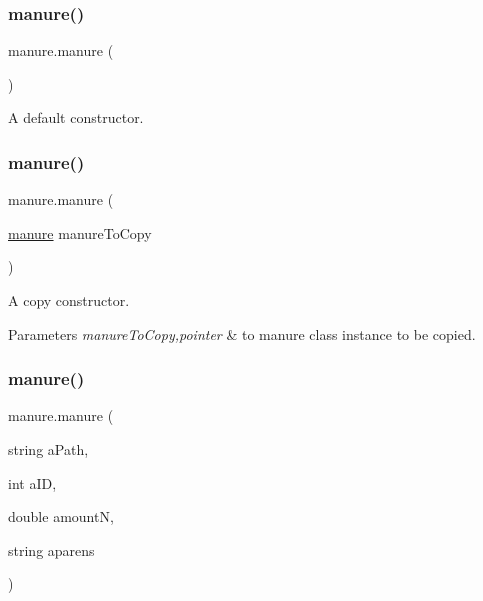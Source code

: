 \subsubsection{\texorpdfstring{manure()}{manure()}\hspace{0.1cm}{\footnotesize\ttfamily [1/3]}}
{\footnotesize\ttfamily manure.\+manure (\begin{DoxyParamCaption}{ }\end{DoxyParamCaption})\hspace{0.3cm}{\ttfamily [inline]}}



A default constructor. 

\mbox{\label{classmanure_a38ddb577591d36f8bd5e4c7d8fed6d51}} 
\subsubsection{\texorpdfstring{manure()}{manure()}\hspace{0.1cm}{\footnotesize\ttfamily [2/3]}}
{\footnotesize\ttfamily manure.\+manure (\begin{DoxyParamCaption}\item[{\mbox{\hyperlink{classmanure}{manure}}}]{manure\+To\+Copy }\end{DoxyParamCaption})\hspace{0.3cm}{\ttfamily [inline]}}



A copy constructor. 


\begin{DoxyParams}{Parameters}
{\em manure\+To\+Copy,pointer} & to manure class instance to be copied. \\
\hline
\end{DoxyParams}
\mbox{\label{classmanure_afb980a45746d9065d8c76ff38e55970a}} 
\subsubsection{\texorpdfstring{manure()}{manure()}\hspace{0.1cm}{\footnotesize\ttfamily [3/3]}}
{\footnotesize\ttfamily manure.\+manure (\begin{DoxyParamCaption}\item[{string}]{a\+Path,  }\item[{int}]{a\+ID,  }\item[{double}]{amountN,  }\item[{string}]{aparens }\end{DoxyParamCaption})\hspace{0.3cm}{\ttfamily [inline]}}



